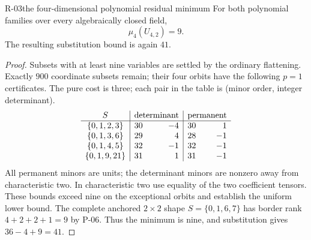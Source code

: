 \begin{finding}{R-03}{the four-dimensional polynomial residual minimum}
For both polynomial families over every algebraically closed
field,
\[
 \mu_4(U_{4,2})=9.
\]
The resulting substitution bound is again \(41\).
\end{finding}
\begin{proof}
Subsets with at least nine variables are settled by the
ordinary flattening. Exactly \(900\) coordinate subsets
remain; their four orbits have the following \(p=1\)
certificates. The pure cost is three; each pair in the
table is (minor order, integer determinant).
\[
 \begin{array}{c|r r|r r}
 S&\multicolumn{2}{c|}{\text{determinant}}&
    \multicolumn{2}{c}{\text{permanent}}\\ \hline
 \{0,1,2,3\}&30&-4&30&1\\
 \{0,1,3,6\}&29&4&28&-1\\
 \{0,1,4,5\}&32&-1&32&-1\\
 \{0,1,9,21\}&31&1&31&-1
 \end{array}
\]
All permanent minors are units; the determinant minors
are nonzero away from characteristic two. In characteristic
two use equality of the two coefficient tensors. These
bounds exceed nine on the exceptional orbits and establish
the uniform lower bound.
The complete anchored \(2\times2\) shape
\(S=\{0,1,6,7\}\) has border rank \(4+2+2+1=9\) by P-06.
Thus the minimum is nine, and substitution gives
\(36-4+9=41\).
\end{proof}

